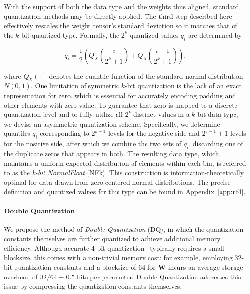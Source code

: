 With the support of both the data type and the weights thus aligned, standard quantization methods may be directly applied. The third step described here effectively rescales the weight tensor's standard deviation so it matches that of the $k$-bit quantized type. Formally, the $2^k$ quantized values $q_i$ are determined by

\begin{equation}
q_i = \frac{1}{2}\left( Q_X\left(\frac{i}{2^k+1}\right) + Q_X\left(\frac{i+1}{2^k+1}\right)\right),
\end{equation}

where $Q_X(\cdot)$ denotes the quantile function of the standard normal distribution $N(0,1)$. One limitation of symmetric $k$-bit quantization is the lack of an exact representation for zero, which is essential for accurately encoding padding and other elements with zero value. To guarantee that zero is mapped to a discrete quantization level and to fully utilize all $2^k$ distinct values in a $k$-bit data type, we devise an asymmetric quantization scheme. Specifically, we determine quantiles $q_i$ corresponding to $2^{k-1}$ levels for the negative side and $2^{k-1}+1$ levels for the positive side, after which we combine the two sets of $q_i$, discarding one of the duplicate zeros that appears in both. The resulting data type, which maintains a uniform expected distribution of elements within each bin, is referred to as the \emph{k-bit NormalFloat} (NFk). This construction is information-theoretically optimal for data drawn from zero-centered normal distributions. The precise definition and quantized values for this type can be found in Appendix~\ref{app:nf4}.

\paragraph{Double Quantization{}} 
We propose the method of \emph{Double Quantization} (DQ), in which the quantization constants themselves are further quantized to achieve additional memory efficiency. Although accurate 4-bit quantization~\citep{dettmers2022case} typically requires a small blocksize, this comes with a non-trivial memory cost: for example, employing 32-bit quantization constants and a blocksize of 64 for $\mathbf{W}$ incurs an average storage overhead of $32/64 = 0.5$ bits per parameter. Double Quantization addresses this issue by compressing the quantization constants themselves.

